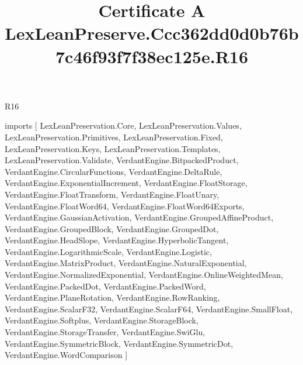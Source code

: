\begin{lexlean}{R16}
\title{Certificate A LexLeanPreserve.Ccc362dd0d0b76b7c46f93f7f38ec125e.R16}
\begin{coremodule}
imports [
  LexLeanPreservation.Core,
  LexLeanPreservation.Values,
  LexLeanPreservation.Primitives,
  LexLeanPreservation.Fixed,
  LexLeanPreservation.Keys,
  LexLeanPreservation.Templates,
  LexLeanPreservation.Validate,
  VerdantEngine.BitpackedProduct,
  VerdantEngine.CircularFunctions,
  VerdantEngine.DeltaRule,
  VerdantEngine.ExponentialIncrement,
  VerdantEngine.FloatStorage,
  VerdantEngine.FloatTransform,
  VerdantEngine.FloatUnary,
  VerdantEngine.FloatWord64,
  VerdantEngine.FloatWord64Exports,
  VerdantEngine.GaussianActivation,
  VerdantEngine.GroupedAffineProduct,
  VerdantEngine.GroupedBlock,
  VerdantEngine.GroupedDot,
  VerdantEngine.HeadSlope,
  VerdantEngine.HyperbolicTangent,
  VerdantEngine.LogarithmicScale,
  VerdantEngine.Logistic,
  VerdantEngine.MatrixProduct,
  VerdantEngine.NaturalExponential,
  VerdantEngine.NormalizedExponential,
  VerdantEngine.OnlineWeightedMean,
  VerdantEngine.PackedDot,
  VerdantEngine.PackedWord,
  VerdantEngine.PlaneRotation,
  VerdantEngine.RowRanking,
  VerdantEngine.ScalarF32,
  VerdantEngine.ScalarF64,
  VerdantEngine.SmallFloat,
  VerdantEngine.Softplus,
  VerdantEngine.StorageBlock,
  VerdantEngine.StorageTransfer,
  VerdantEngine.SwiGlu,
  VerdantEngine.SymmetricBlock,
  VerdantEngine.SymmetricDot,
  VerdantEngine.WordComparison
]


\end{coremodule}
\end{lexlean}
